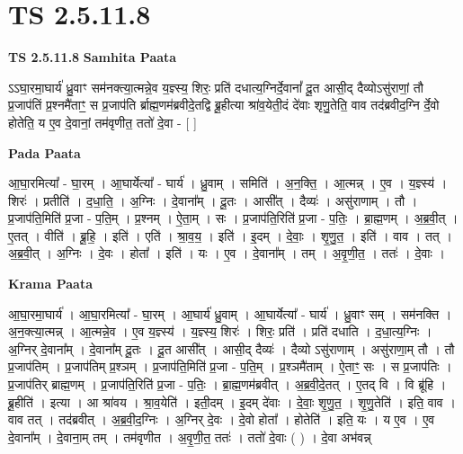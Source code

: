 \documentclass[17pt]{extarticle}
\begin{document}
\section*{ TS 2.5.11.8 }

\textbf{TS 2.5.11.8 } \newline
\textbf{Samhita Paata} \newline

ऽऽघा॒रमा॒घार्य॑ ध्रु॒वाꣳ सम॑नक्त्या॒त्मन्ने॒व य॒ज्ञ्स्य॒ शिरः॒ प्रति॑ दधात्य॒ग्निर्दे॒वानां᳚ दू॒त आसी॒द् दैव्योऽसु॑राणां॒ तौ प्र॒जाप॑तिं प्र॒श्नमै॑ताꣳ॒॒ स प्र॒जाप॑ति र्ब्राह्म॒णम॑ब्रवीदे॒तद्वि ब्रू॒हीत्या श्रा॑व॒येती॒दं दे॑वाः शृणु॒तेति॒ वाव तद॑ब्रवीद॒ग्नि र्दे॒वो होतेति॒ य ए॒व दे॒वानां॒ तम॑वृणीत॒ ततो॑ दे॒वा - [  ] \newline

\textbf{Pada Paata} \newline

आ॒घा॒रमित्या᳚ - घा॒रम् । आ॒घार्येत्या᳚ - घार्य॑ । ध्रु॒वाम् । समिति॑ । अ॒न॒क्ति॒ । आ॒त्मन्न् । ए॒व । य॒ज्ञ्स्य॑ । शिरः॑ । प्रतीति॑ । द॒धा॒ति॒ । अ॒ग्निः । दे॒वाना᳚म् । दू॒तः । आसी᳚त् । दैव्यः॑ । असु॑राणाम् । तौ । प्र॒जाप॑ति॒मिति॑ प्र॒जा - प॒ति॒म् । प्र॒श्नम् । ऐ॒ता॒म् । सः । प्र॒जाप॑ति॒रिति॑ प्र॒जा - प॒तिः॒ । ब्रा॒ह्म॒णम् । अ॒ब्र॒वी॒त् । ए॒तत् । वीति॑ । ब्रू॒हि॒ । इति॑ । एति॑ । श्रा॒व॒य॒ । इति॑ । इ॒दम् । दे॒वाः॒ । शृ॒णु॒त॒ । इति॑ । वाव । तत् । अ॒ब्र॒वी॒त् । अ॒ग्निः । दे॒वः । होता᳚ । इति॑ । यः । ए॒व । दे॒वाना᳚म् । तम् । अ॒वृ॒णी॒त॒ । ततः॑ । दे॒वाः ।  \newline


\textbf{Krama Paata} \newline

आ॒घा॒रमा॒घार्य॑ । आ॒घा॒रमित्या᳚ - घा॒रम् । आ॒घार्य॑ ध्रु॒वाम् । आ॒घार्येत्या᳚ - घार्य॑ । ध्रु॒वाꣳ सम् । सम॑नक्ति । अ॒न॒क्त्या॒त्मन्न् । आ॒त्मन्ने॒व । ए॒व य॒ज्ञ्स्य॑ । य॒ज्ञ्स्य॒ शिरः॑ । शिरः॒ प्रति॑ । प्रति॑ दधाति । द॒धा॒त्य॒ग्निः । अ॒ग्निर् दे॒वाना᳚म् । दे॒वाना᳚म् दू॒तः । दू॒त आसी᳚त् । आसी॒द् दैव्यः॑ । दैव्यो ऽसु॑राणाम् । असु॑राणा॒म् तौ । तौ प्र॒जाप॑तिम् । प्र॒जाप॑तिम् प्र॒श्ञम् । प्र॒जाप॑ति॒मिति॑ प्र॒जा - प॒ति॒म् । प्र॒श्ञमै॑ताम् । ऐ॒ताꣳ॒॒ सः । स प्र॒जाप॑तिः । प्र॒जाप॑तिर् ब्राह्म॒णम् । प्र॒जाप॑ति॒रिति॑ प्र॒जा - प॒तिः॒ । ब्रा॒ह्म॒णम॑ब्रवीत् । अ॒ब्र॒वी॒दे॒तत् । ए॒तद् वि । वि ब्रू॑हि । ब्रू॒हीति॑ । इत्या । आ श्रा॑वय । श्रा॒व॒येति॑ । इती॒दम् । इ॒दम् दे॑वाः । दे॒वाः॒ शृ॒णु॒त॒ । शृ॒णु॒तेति॑ । इति॒ वाव । वाव तत् । तद॑ब्रवीत् । अ॒ब्र॒वी॒द॒ग्निः । अ॒ग्निर् दे॒वः । दे॒वो होता᳚ । होतेति॑ । इति॒ यः । य ए॒व । ए॒व दे॒वाना᳚म् । दे॒वाना॒म् तम् । तम॑वृणीत । अ॒वृ॒णी॒त॒ ततः॑ । ततो॑ दे॒वाः ( ) । दे॒वा अभ॑वन्न् \newline
\end{document}
